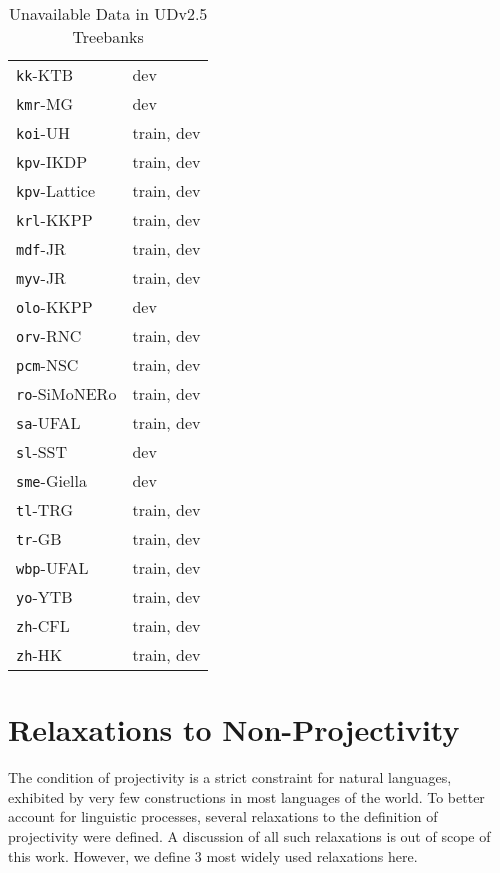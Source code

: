 \begin{table}[H]
\begin{tabular}{|l|l|}
    \hline 
    \hline
    \texttt{kk}-KTB & dev \\
    \texttt{kmr}-MG & dev \\
    \texttt{koi}-UH & train, dev\\
    \texttt{kpv}-IKDP & train, dev \\
    \texttt{kpv}-Lattice & train, dev \\
    \texttt{krl}-KKPP & train, dev \\
    \texttt{mdf}-JR & train, dev \\
    \texttt{myv}-JR & train, dev \\
    \texttt{olo}-KKPP & dev \\
    \texttt{orv}-RNC & train, dev \\
    \texttt{pcm}-NSC & train, dev \\
    \texttt{ro}-SiMoNERo & train, dev \\
    \texttt{sa}-UFAL & train, dev \\
    \texttt{sl}-SST & dev \\
    \texttt{sme}-Giella & dev \\
    \texttt{tl}-TRG & train, dev \\
    \texttt{tr}-GB & train, dev \\
    \texttt{wbp}-UFAL & train, dev \\
    \texttt{yo}-YTB & train, dev \\
    \texttt{zh}-CFL & train, dev \\
    \texttt{zh}-HK & train, dev \\
    \hline
\end{tabular}
\caption{Unavailable Data in UDv2.5 Treebanks}
\label{tab:test_only}
\end{table}

\newpage
\section{Relaxations to Non-Projectivity}
\label{app:nonproj-relaxations}

The condition of projectivity is a strict constraint for natural languages, exhibited by very few constructions in most languages of the world. To better account for linguistic processes, several relaxations to the definition of projectivity were defined. A discussion of all such relaxations is out of scope of this work. However, we define 3 most widely used relaxations here.

